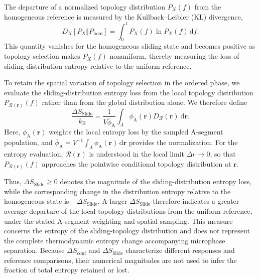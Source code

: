 \documentclass[journal=mamobx,manuscript=article]{achemso}
\begin{document}
The departure of a normalized topology distribution $P_X(f)$ from the homogeneous reference is measured by the Kullback--Leibler (KL) divergence,\cite{Kullback1951Information}
\begin{equation}
    D_X
    \left[P_X\Vert P_{\mathrm{hom}}\right]
    =
    \int_0^1
    P_X(f)\ln P_X(f)\,
    \mathrm df.
    \label{eq:KLDivergence}
\end{equation}
This quantity vanishes for the homogeneous sliding state and becomes positive as topology selection makes $P_X(f)$ nonuniform, thereby measuring the loss of sliding-distribution entropy relative to the uniform reference.


To retain the spatial variation of topology selection in the ordered phase, we evaluate the sliding-distribution entropy loss from the local topology distribution $P_{\mathcal R(\bm r)}(f)$ rather than from the global distribution alone.
We therefore define
\begin{equation}
    \frac{\Delta S_{\mathrm{Slide}}}{k_{\mathrm B}}
    =
    \frac{1}{V \bar{\phi}_{\mathrm A}}
    \int_\Lambda
    \phi_{\mathrm A}(\bm r) D_{\mathcal R}(\bm r) \ \mathrm d\bm r.
    \label{eq:SlideEntropyKL}
\end{equation}
Here, $\phi_{\mathrm A}(\bm r)$ weights the local entropy loss by the sampled A-segment population, and $\bar{\phi}_{\mathrm A}=V^{-1}\int_\Lambda\phi_{\mathrm A}(\bm r)\,\mathrm d\bm r$ provides the normalization.
For the entropy evaluation, $\mathcal R(\bm r)$ is understood in the local limit $\Delta r\to 0$, so that $P_{\mathcal R(\bm r)}(f)$ approaches the pointwise conditional topology distribution at $\bm r$.

Thus, $\Delta S_{\mathrm{Slide}}\geq 0$ denotes the magnitude of the sliding-distribution entropy loss, while the corresponding change in the distribution entropy relative to the homogeneous state is $-\Delta S_{\mathrm{Slide}}$.
A larger $\Delta S_{\mathrm{Slide}}$ therefore indicates a greater average departure of the local topology distributions from the uniform reference, under the stated A-segment weighting and spatial sampling.
This measure concerns the entropy of the sliding-topology distribution and does not represent the complete thermodynamic entropy change accompanying microphase separation.
Because $\Delta S_{\mathrm{conf}}$ and $\Delta S_{\mathrm{Slide}}$ characterize different responses and reference comparisons, their numerical magnitudes are not used to infer the fraction of total entropy retained or lost.
\end{document}

